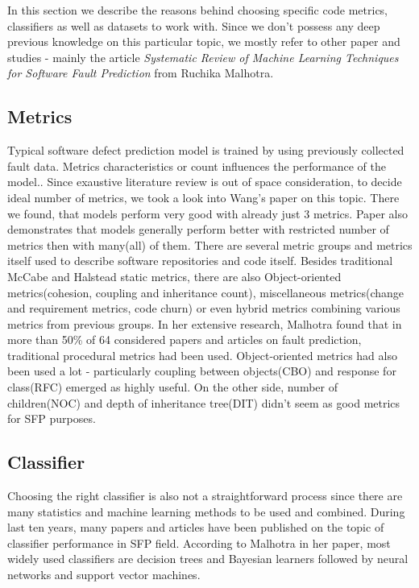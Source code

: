 In this section we describe the reasons behind choosing specific code metrics, classifiers as well as datasets to work with. Since we don't possess any deep previous knowledge on this particular topic, we mostly refer to other paper and studies - mainly the article \textit{Systematic Review of Machine Learning Techniques for Software Fault Prediction}\cite{malhotra2015systematic} from Ruchika Malhotra.

\subsection{Metrics}
Typical software defect prediction model is trained by using previously collected fault data. Metrics characteristics or count influences the performance of the model.\cite{wang2011many}. Since exaustive literature review is out of space consideration, to decide ideal number of metrics, we took a look into Wang's paper on this topic\cite{wang2011many}. There we found, that models perform very good with already just 3 metrics. Paper also demonstrates that models generally perform better with restricted number of metrics then with many(all) of them. There are several metric groups and metrics itself used to describe software repositories and code itself. Besides traditional McCabe and Halstead static metrics, there are also Object-oriented metrics(cohesion, coupling and inheritance count), miscellaneous metrics(change and requirement metrics, code churn) or even hybrid metrics combining various metrics from previous groups. In her extensive research, Malhotra found that in more than 50\% of 64 considered papers and articles on fault prediction, traditional procedural metrics had been used. Object-oriented metrics had also been used a lot - particularly coupling between objects(CBO) and response for class(RFC) emerged as highly useful. On the other side,  number of children(NOC) and depth of inheritance tree(DIT) didn't seem as
good metrics for SFP purposes\cite[p.~15]{malhotra2015systematic}.

\subsection{Classifier}
Choosing the right classifier is also not a straightforward process since there are many statistics and machine learning methods to be used and combined. During last ten years, many papers and articles have been published on the topic of classifier performance in SFP field. According to Malhotra in her paper, most widely used classifiers are decision trees and Bayesian learners followed by neural networks and support vector machines\cite[p.~11]{malhotra2015systematic}.

